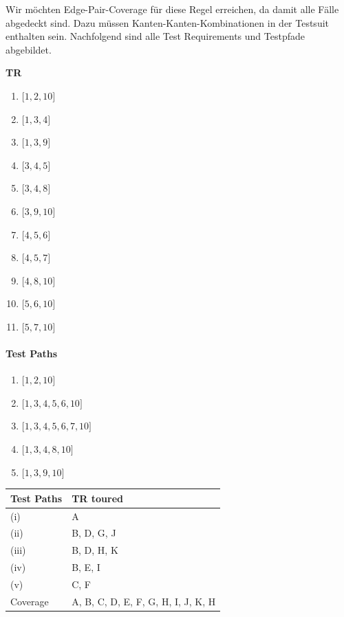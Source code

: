 \documentclass[ngerman]{article}
\begin{document}
Wir möchten Edge-Pair-Coverage für diese Regel erreichen, da damit alle Fälle abgedeckt sind. 
Dazu müssen Kanten-Kanten-Kombinationen in der Testsuit enthalten sein.
Nachfolgend sind alle Test Requirements und Testpfade abgebildet.


\vspace{1em}


\begin{paracol}{2}
 \textbf{TR}
\begin{enumerate}[label=\Alph*]
\item $\lbrack 1,2,10 \rbrack$
\item $\lbrack 1,3,4\rbrack$
\item $\lbrack 1,3,9\rbrack$
\item $\lbrack 3,4,5\rbrack$
\item $\lbrack 3,4,8\rbrack$
\item $\lbrack 3,9,10\rbrack$
\item $\lbrack 4,5,6\rbrack$
\item $\lbrack 4,5,7\rbrack$
\item $\lbrack 4,8,10\rbrack$
\item $\lbrack 5,6,10\rbrack$
\item $\lbrack 5,7,10\rbrack$
\end{enumerate}
\switchcolumn*

\paragraph{Test Paths}
\begin{enumerate}[label=(\roman*)]
\item $\lbrack 1, 2, 10 \rbrack$
\item $\lbrack 1, 3, 4, 5, 6, 10\rbrack$
\item $\lbrack 1, 3, 4, 5, 6, 7, 10\rbrack$
\item $\lbrack 1, 3, 4, 8, 10\rbrack$
\item $\lbrack 1, 3, 9, 10\rbrack$
\end{enumerate}

\switchcolumn*
\end{paracol}


\begin{table}
\begin{tabular}{|l|l|}
Test Paths & TR toured \\ \hline \hline
(i) & A\\ \hline
(ii)  & B, D, G, J \\ \hline
(iii) & B, D, H, K\\ \hline
(iv) & B, E, I\\ \hline
(v) & C, F\\ \hline \hline
Coverage & A, B, C, D, E, F, G, H, I, J, K, H\\ \hline
\end{tabular}
\end{table}
\end{document}
